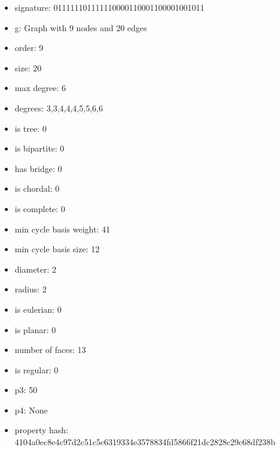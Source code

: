 \newpage
\begin{figure}
\end{figure}
\begin{itemize}
\item signature: 011111101111110000110001100001001011
\item g: Graph with 9 nodes and 20 edges
\item order: 9
\item size: 20
\item max degree: 6
\item degrees: 3,3,4,4,4,5,5,6,6
\item is tree: 0
\item is bipartite: 0
\item has bridge: 0
\item is chordal: 0
\item is complete: 0
\item min cycle basis weight: 41
\item min cycle basis size: 12
\item diameter: 2
\item radius: 2
\item is eulerian: 0
\item is planar: 0
\item number of faces: 13
\item is regular: 0
\item p3: 50
\item p4: None
\item property hash: 4104a0ec8e4c97d2c51c5c6319334e3578834fd5866f21dc2828c29c68df238b
\end{itemize}
